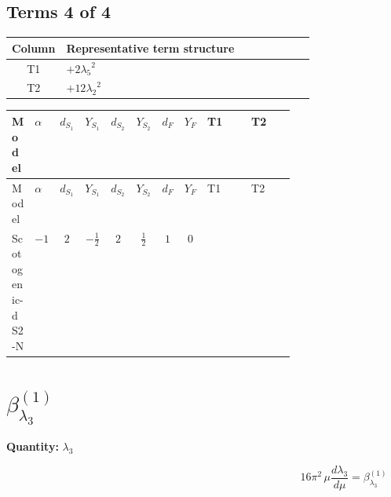 \documentclass[8pt]{article}
\begin{document}
\begin{landscape}
\subsection*{Terms 4 of 4}
\begin{center}
\begin{tabular}{@{}c >{\raggedright\arraybackslash}p{0.82\linewidth}@{}}
\toprule
Column & Representative term structure \\
\midrule
T1 & \(\displaystyle +2 {\lambda_5}^2\) \\
\midrule
T2 & \(\displaystyle +12 {\lambda_2}^2\) \\
\midrule
\bottomrule
\end{tabular}
\end{center}
\smallskip
\tiny
\begin{longtable}{@{}llcccccc >{\raggedright\arraybackslash}p{0.21\linewidth} >{\raggedright\arraybackslash}p{0.21\linewidth}@{}}
\toprule
Model & $\alpha$ & $d_{S_1}$ & $Y_{S_1}$ & $d_{S_2}$ & $Y_{S_2}$ & $d_F$ & $Y_F$ & T1 & T2 \\
\midrule
\endfirsthead
\toprule
Model & $\alpha$ & $d_{S_1}$ & $Y_{S_1}$ & $d_{S_2}$ & $Y_{S_2}$ & $d_F$ & $Y_F$ & T1 & T2 \\
\midrule
\endhead
Scotogenic-dS2-N & $-1$ & $2$ & $-\frac{1}{2}$ & $2$ & $\frac{1}{2}$ & $1$ & $0$ & \scriptsize\adjustbox{max width=\linewidth}{$\begin{gathered} +2 {\lambda_5}^2\end{gathered}$} & \scriptsize\adjustbox{max width=\linewidth}{$\begin{gathered} +12 {\lambda_2}^2\end{gathered}$} \\
\midrule
\bottomrule
\end{longtable}
\clearpage
\section*{$\beta_{\lambda_3}^{(1)}$}
\noindent\textbf{Quantity: }$\lambda_3$\par\smallskip
\[16\pi^2\,\mu\frac{d \lambda_3}{d\mu}=\beta_{\lambda_3}^{(1)}\]

\end{landscape}
\end{document}
